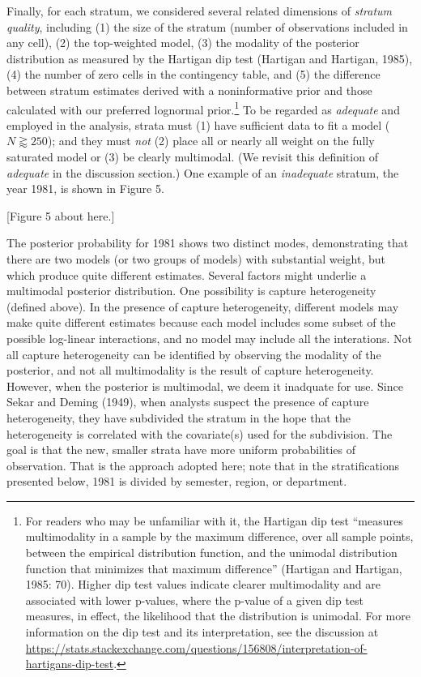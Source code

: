 \documentclass[11pt,]{article}
\let\rmarkdownfootnote\footnote%
\def\footnote{\protect\rmarkdownfootnote}
\begin{document}
Finally, for each stratum, we considered several related dimensions of
\emph{stratum quality}, including (1) the size of the stratum (number of
observations included in any cell), (2) the top-weighted model, (3) the
modality of the posterior distribution as measured by the Hartigan dip
test (Hartigan and Hartigan, 1985), (4) the number of zero cells in the
contingency table, and (5) the difference between stratum estimates
derived with a noninformative prior and those calculated with our
preferred lognormal prior.\footnote{For readers who may be unfamiliar
  with it, the Hartigan dip test ``measures multimodality in a sample by
  the maximum difference, over all sample points, between the empirical
  distribution function, and the unimodal distribution function that
  minimizes that maximum difference'' (Hartigan and Hartigan, 1985: 70).
  Higher dip test values indicate clearer multimodality and are
  associated with lower p-values, where the p-value of a given dip test
  measures, in effect, the likelihood that the distribution is unimodal.
  For more information on the dip test and its interpretation, see the
  discussion at
  \url{https://stats.stackexchange.com/questions/156808/interpretation-of-hartigans-dip-test}.}
To be regarded as \emph{adequate} and employed in the analysis, strata
must (1) have sufficient data to fit a model (\(N \gtrapprox 250\)); and
they must \emph{not} (2) place all or nearly all weight on the fully
saturated model or (3) be clearly multimodal. (We revisit this
definition of \emph{adequate} in the discussion section.) One example of
an \emph{inadequate} stratum, the year 1981, is shown in Figure 5.

{[}Figure 5 about here.{]}

The posterior probability for 1981 shows two distinct modes,
demonstrating that there are two models (or two groups of models) with
substantial weight, but which produce quite different estimates. Several
factors might underlie a multimodal posterior distribution. One
possibility is capture heterogeneity (defined above). In the presence of
capture heterogeneity, different models may make quite different
estimates because each model includes some subset of the possible
log-linear interactions, and no model may include all the interations.
Not all capture heterogeneity can be identified by observing the
modality of the posterior, and not all multimodality is the result of
capture heterogeneity. However, when the posterior is multimodal, we
deem it inadquate for use. Since Sekar and Deming (1949), when analysts
suspect the presence of capture heterogeneity, they have subdivided the
stratum in the hope that the heterogeneity is correlated with the
covariate(s) used for the subdivision. The goal is that the new, smaller
strata have more uniform probabilities of observation. That is the
approach adopted here; note that in the stratifications presented below,
1981 is divided by semester, region, or department.
\end{document}
